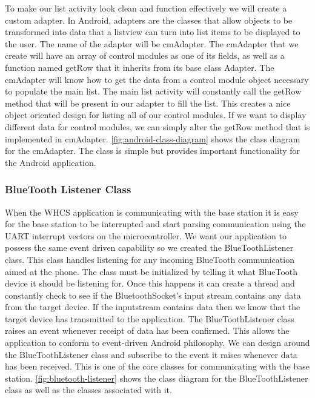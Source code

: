 To make our list activity look clean and function effectively we will create a
custom adapter. In Android, adapters are the classes that allow objects to be
transformed into data that a listview can turn into list items to be displayed
to the user. The name of the adapter will be cmAdapter. The cmAdapter that we
create will have an array of control modules as one of its fields, as well as a
function named getRow that it inherits from its base class Adapter. The
cmAdapter will know how to get the data from a control module object necessary
to populate the main list. The main list activity will constantly call the
getRow method that will be present in our adapter to fill the list. This
creates a nice object oriented design for listing all of our control modules.
If we want to display different data for control modules, we can simply alter
the getRow method that is implemented in cmAdapter.
\autoref{fig:android-class-diagram} shows the class diagram for the cmAdapter.
The class is simple but provides important functionality for the Android
application.


\subsubsection{BlueTooth Listener Class} When the WHCS application is
communicating with the base station it is easy for the base station to be
interrupted and start parsing communication using the UART interrupt vectors on
the microcontroller. We want our application to possess the same event driven
capability so we created the BlueToothListener class. This class handles
listening for any incoming BlueTooth communication aimed at the phone. The
class must be initialized by telling it what BlueTooth device it should be
listening for. Once this happens it can create a thread and constantly check to
see if the BluetoothSocket{}'s input stream contains any data from the target
device. If the inputstream contains data then we know that the target device
has transmitted to the application. The BlueToothListener class raises an event
whenever receipt of data has been confirmed. This allows the application to
conform to event{}-driven Android philosophy. We can design around the
BlueToothListener class and subscribe to the event it raises whenever data has
been received. This is one of the core classes for communicating with the base
station. \autoref{fig:bluetooth-listener} shows the class diagram for the
BlueToothListener class as well as the classes associated with it.

